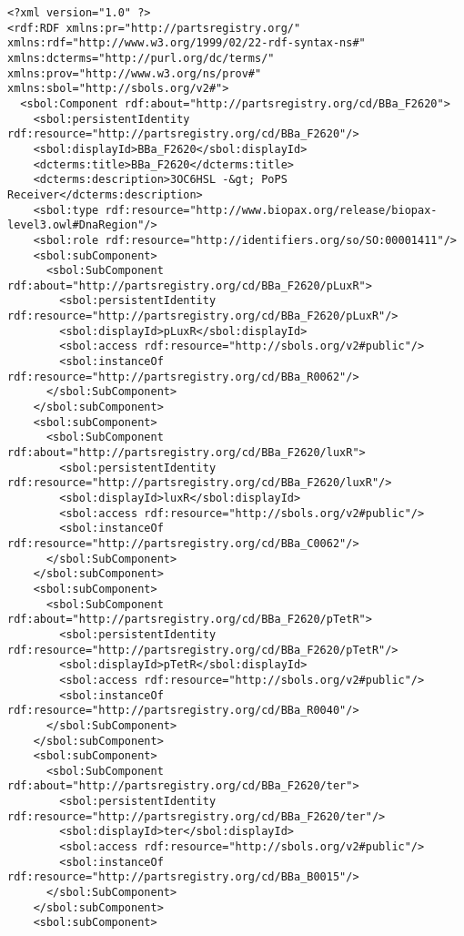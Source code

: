 \label{ser:F2620}
\begin{lstlisting}
<?xml version="1.0" ?>
<rdf:RDF xmlns:pr="http://partsregistry.org/" xmlns:rdf="http://www.w3.org/1999/02/22-rdf-syntax-ns#" xmlns:dcterms="http://purl.org/dc/terms/" xmlns:prov="http://www.w3.org/ns/prov#" xmlns:sbol="http://sbols.org/v2#">
  <sbol:Component rdf:about="http://partsregistry.org/cd/BBa_F2620">
    <sbol:persistentIdentity rdf:resource="http://partsregistry.org/cd/BBa_F2620"/>
    <sbol:displayId>BBa_F2620</sbol:displayId>
    <dcterms:title>BBa_F2620</dcterms:title>
    <dcterms:description>3OC6HSL -&gt; PoPS Receiver</dcterms:description>
    <sbol:type rdf:resource="http://www.biopax.org/release/biopax-level3.owl#DnaRegion"/>
    <sbol:role rdf:resource="http://identifiers.org/so/SO:00001411"/>
    <sbol:subComponent>
      <sbol:SubComponent rdf:about="http://partsregistry.org/cd/BBa_F2620/pLuxR">
        <sbol:persistentIdentity rdf:resource="http://partsregistry.org/cd/BBa_F2620/pLuxR"/>
        <sbol:displayId>pLuxR</sbol:displayId>
        <sbol:access rdf:resource="http://sbols.org/v2#public"/>
        <sbol:instanceOf rdf:resource="http://partsregistry.org/cd/BBa_R0062"/>
      </sbol:SubComponent>
    </sbol:subComponent>
    <sbol:subComponent>
      <sbol:SubComponent rdf:about="http://partsregistry.org/cd/BBa_F2620/luxR">
        <sbol:persistentIdentity rdf:resource="http://partsregistry.org/cd/BBa_F2620/luxR"/>
        <sbol:displayId>luxR</sbol:displayId>
        <sbol:access rdf:resource="http://sbols.org/v2#public"/>
        <sbol:instanceOf rdf:resource="http://partsregistry.org/cd/BBa_C0062"/>
      </sbol:SubComponent>
    </sbol:subComponent>
    <sbol:subComponent>
      <sbol:SubComponent rdf:about="http://partsregistry.org/cd/BBa_F2620/pTetR">
        <sbol:persistentIdentity rdf:resource="http://partsregistry.org/cd/BBa_F2620/pTetR"/>
        <sbol:displayId>pTetR</sbol:displayId>
        <sbol:access rdf:resource="http://sbols.org/v2#public"/>
        <sbol:instanceOf rdf:resource="http://partsregistry.org/cd/BBa_R0040"/>
      </sbol:SubComponent>
    </sbol:subComponent>
    <sbol:subComponent>
      <sbol:SubComponent rdf:about="http://partsregistry.org/cd/BBa_F2620/ter">
        <sbol:persistentIdentity rdf:resource="http://partsregistry.org/cd/BBa_F2620/ter"/>
        <sbol:displayId>ter</sbol:displayId>
        <sbol:access rdf:resource="http://sbols.org/v2#public"/>
        <sbol:instanceOf rdf:resource="http://partsregistry.org/cd/BBa_B0015"/>
      </sbol:SubComponent>
    </sbol:subComponent>
    <sbol:subComponent>

\end{lstlisting}
